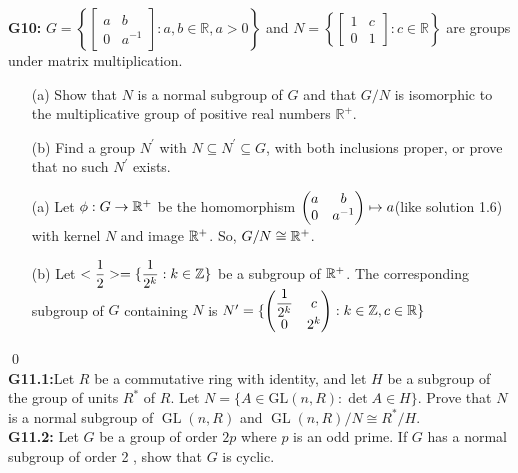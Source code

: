 \textbf{G10:} $G=\left\{\left[\begin{array}{cc}a & b \\ 0 & a^{-1}\end{array}\right]: a, b \in \mathbb{R}, a>0\right\}$ and $N=\left\{\left[\begin{array}{ll}1 & c \\ 0 & 1\end{array}\right]: c \in \mathbb{R}\right\}$ are groups under matrix multiplication.
\begin{itemize}
	\item[(a)] Show that $N$ is a normal subgroup of $G$ and that $G / N$ is isomorphic to the multiplicative group of positive real numbers $\mathbb{R}^{+}$.
	\item[(b)] Find a group $N^{\prime}$ with $N \subseteq N^{\prime} \subseteq G$, with both inclusions proper, or prove that no such $N^{\prime}$ exists.
\end{itemize}
\soln 
\begin{itemize}
	\item[(a)] Let $ \phi: G\to \mathbb{R}^+ $ be the homomorphism $ \begin{pmatrix} a & b\\ 0 & a^{-1} \end{pmatrix}\mapsto a $(like solution 1.6) with kernel $ N $ and image $ \mathbb{R}^+ $. So, $ G/N\cong \mathbb{R}^+ $.  
	\item[(b)] Let $ <\dfrac{1}{2}>=\{\dfrac{1}{2^k}: k\in \mathbb{Z}\} $ be a subgroup of $ \mathbb{R}^+ $. The corresponding subgroup of $ G $ containing $ N $ is $ N'=\{\begin{pmatrix} \dfrac{1}{2^k} & c\\ 0 & 2^k \end{pmatrix}: k\in \mathbb{Z}, c\in\mathbb{R}\} $
\end{itemize}
\qed\\


\textbf{G11.1:}Let $R$ be a commutative ring with identity, and let $H$ be a subgroup of the group of units $R^{*}$ of $R$. Let $N=\{A \in \mathrm{GL}(n, R): \operatorname{det} A \in H\}$. Prove that $N$ is a normal subgroup of $\operatorname{GL}(n, R)$ and $\operatorname{GL}(n, R) / N \cong R^{*} / H$.\\
\textbf{G11.2:} Let $G$ be a group of order $2 p$ where $p$ is an odd prime. If $G$ has a normal subgroup of order 2 , show that $G$ is cyclic.\\
\soln

